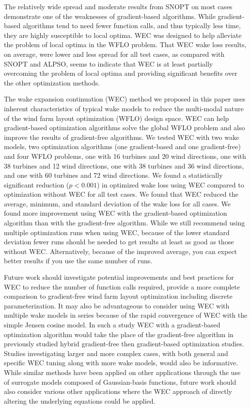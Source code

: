 \documentclass[journal abbreviation, manuscript]{copernicus}
\begin{document}
	The relatively wide spread and moderate results from SNOPT on most cases demonstrate one of the weaknesses of gradient-based algorithms. While gradient-based algorithms tend to need fewer function calls, and thus typically less time, they are highly susceptible to local optima. WEC was designed to help alleviate the problem of local optima in the WFLO problem. That WEC wake loss results, on average, were lower and less spread for all test cases, as compared with SNOPT and ALPSO, seems to indicate that WEC is at least partially overcoming the problem of local optima and providing significant benefits over the other optimization methods.
	
	\conclusions \label{sec:conclusion} %
	
	The wake expansion continuation (WEC) method we proposed in this paper uses inherent characteristics of typical wake models to reduce the multi-modal nature of the wind farm layout optimization (WFLO) design space. WEC can help gradient-based optimization algorithms solve the global WFLO problem and also improve the results of gradient-free algorithms. We tested WEC with two wake models, two optimization algorithms (one gradient-based and one gradient-free) and four WFLO problems, one with 16 turbines and 20 wind directions, one with 38 turbines and 12 wind directions, one with 38 turbines and 36 wind directions, and one with 60 turbines and 72 wind directions. We found a statistically significant reduction ($p<0.001$) in optimized wake loss using WEC compared to optimization without WEC for all test cases. We found that WEC reduced the average, minimum, and standard deviation of the wake loss for all cases. We found more improvement using WEC with the gradient-based optimization algorithm than with the gradient-free algorithm. While we still recommend using multiple optimization runs when using WEC, because of the lower standard deviation fewer runs should be needed to get results at least as good as those without WEC. Alternatively, because of the improved average, you can expect better results if you use the same number of runs.
	
	Future work should investigate potential improvements and best practices for WEC to reduce the number of function calls required, provide a more complete comparison to gradient-free wind farm layout optimization including discrete parameterization. It may also be advantageous to consider using WEC with multiple wake models in series because of the rapid convergence of WEC with the simple Jensen cosine model. In such a study WEC with a gradient-based optimization algorithm would take the place of the gradient-free algorithm in previously studied hybrid gradient-free then gradient-based optimization studies. Studies investigating larger and more complex cases, with both general and specific WEC tuning along with more wake models, would also be informative. While similar methods have been applied on other applications through the use of surrogate models composed of Gaussian-basis functions, future work should also consider various other applications where the WEC approach of directly altering the underlying equations could be applied.
	
\end{document}
